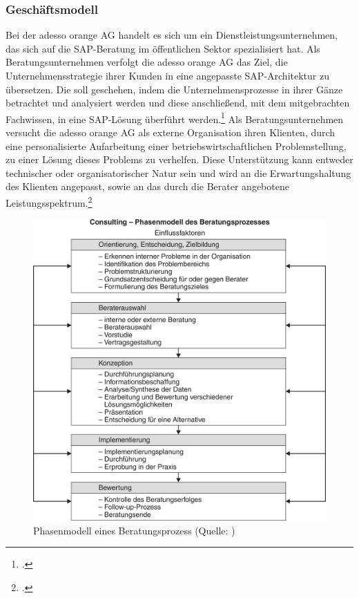 \subsubsection{Geschäftsmodell}
Bei der adesso orange AG handelt es sich um ein Dienstleistungsunternehmen, das sich auf die SAP-Beratung im öffentlichen Sektor spezialisiert hat. Als Beratungsunternehmen verfolgt die adesso orange AG das Ziel, die Unternehmensstrategie ihrer Kunden in eine angepasste SAP-Architektur zu übersetzen. Die soll geschehen, indem die Unternehmensprozesse in ihrer Gänze betrachtet und analysiert werden und diese anschließend, mit dem mitgebrachten Fachwissen, in eine SAP-Lösung überführt werden.\footcite[Vgl.][]{ao-main} Als Beratungsunternehmen versucht die adesso orange AG als externe Organisation ihren Klienten, durch eine personalisierte Aufarbeitung einer betriebswirtschaftlichen Problemstellung, zu einer Lösung dieses Problems zu verhelfen. Diese Unterstützung kann entweder technischer oder organisatorischer Natur sein und wird an die Erwartungshaltung des Klienten angepasst, sowie an das durch die Berater angebotene Leistungsspektrum.\footcite[Vgl.][]{gabler-beratung}
\begin{figure}[h!]
    \centering
    \includegraphics[scale=0.4]{./Bilder/Beratungsprozess.png}
    \caption[Phasenmodell eines Beratungsprozess]{Phasenmodell eines Beratungsprozess (Quelle: \cite[][]{gabler-beratung})}
\end{figure}
